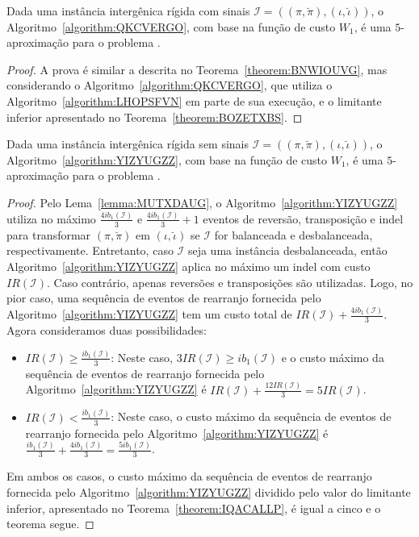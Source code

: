 \begin{theorem}\label{theorem:JKFXFCMF}
Dada uma instância intergênica rígida com sinais $\mathcal{I}=((\pi,\breve\pi),(\iota,\breve\iota))$, o Algoritmo~\ref{algorithm:QKCVERGO}, com base na função de custo $W_1$, é uma $5$-aproximação para o problema \SbWIRI{}.
\end{theorem}
\begin{proof}
A prova é similar a descrita no Teorema~\ref{theorem:BNWIOUVG}, mas considerando o Algoritmo~\ref{algorithm:QKCVERGO}, que utiliza o Algoritmo~\ref{algorithm:LHOPSFVN} em parte de sua execução, e o limitante inferior apresentado no Teorema~\ref{theorem:BOZETXBS}.
\end{proof}

\begin{theorem}\label{theorem:YATYVCZX}
Dada uma instância intergênica rígida sem sinais $\mathcal{I}=((\pi,\breve\pi),(\iota,\breve\iota))$, o Algoritmo~\ref{algorithm:YIZYUGZZ}, com base na função de custo $W_1$, é uma $5$-aproximação para o problema \SbWIRTI{}.
\end{theorem}
\begin{proof}
Pelo Lema~\ref{lemma:MUTXDAUG}, o Algoritmo~\ref{algorithm:YIZYUGZZ} utiliza no máximo $\frac{4ib_1(\mathcal{I})}{3}$ e $\frac{4ib_1(\mathcal{I})}{3} + 1$ eventos de reversão, transposição e indel para transformar $(\pi,\breve\pi)$ em $(\iota,\breve\iota)$ se $\mathcal{I}$ for balanceada e desbalanceada, respectivamente. Entretanto, caso $\mathcal{I}$ seja uma instância desbalanceada, então Algoritmo~\ref{algorithm:YIZYUGZZ} aplica no máximo um indel com custo $IR(\mathcal{I})$. Caso contrário, apenas reversões e transposições são utilizadas. Logo, no pior caso, uma sequência de eventos de rearranjo fornecida pelo Algoritmo~\ref{algorithm:YIZYUGZZ} tem um custo total de $IR(\mathcal{I}) + \frac{4ib_1(\mathcal{I})}{3}$. Agora consideramos duas possibilidades:
\begin{itemize}
  \item $IR(\mathcal{I}) \ge \frac{ib_1(\mathcal{I})}{3}$: Neste caso, $3IR(\mathcal{I}) \ge ib_1(\mathcal{I})$ e o custo máximo da sequência de eventos de rearranjo fornecida pelo Algoritmo~\ref{algorithm:YIZYUGZZ} é $IR(\mathcal{I}) + \frac{12IR(\mathcal{I})}{3} = 5IR(\mathcal{I})$.
  \item $IR(\mathcal{I}) < \frac{ib_1(\mathcal{I})}{3}$: Neste caso, o custo máximo da sequência de eventos de rearranjo fornecida pelo Algoritmo~\ref{algorithm:YIZYUGZZ} é $\frac{ib_1(\mathcal{I})}{3} + \frac{4ib_1(\mathcal{I})}{3} = \frac{5ib_1(\mathcal{I})}{3}$.
\end{itemize}
Em ambos os casos, o custo máximo da sequência de eventos de rearranjo fornecida pelo Algoritmo~\ref{algorithm:YIZYUGZZ} dividido pelo valor do limitante inferior, apresentado no Teorema~\ref{theorem:IQACALLP}, é igual a cinco e o teorema segue.
\end{proof}

